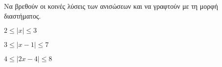 Να βρεθούν οι κοινές λύσεις των ανισώσεων και να γραφτούν με τη μορφή διαστήματος.
\begin{multicols}{3}
\begin{alist}
\item $ 2\leq\left|x\right|\leq3 $
\item $ 3\leq\left|x-1\right|\leq7 $
\item $4\leq\left|2x-4\right|\leq8 $
\end{alist}
\end{multicols}
